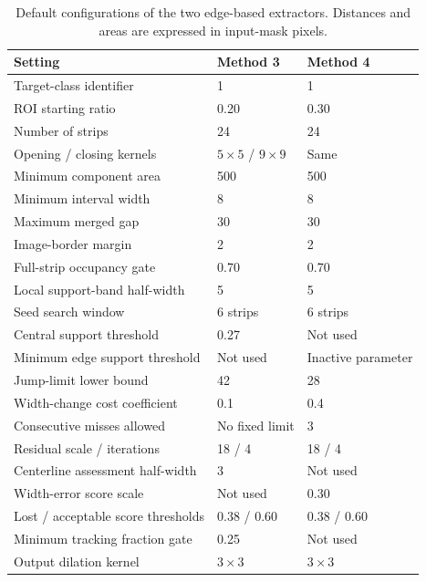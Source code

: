 \begin{table}[htbp]
    \centering
    \small
    \caption{Default configurations of the two edge-based extractors.
    Distances and areas are expressed in input-mask pixels.}
    \label{tab:c4_defaults}
    \begin{tabularx}{\textwidth}{@{}X l l@{}}
        \toprule
        Setting & Method 3 & Method 4 \\
        \midrule
        Target-class identifier & 1 & 1 \\
        ROI starting ratio & 0.20 & 0.30 \\
        Number of strips & 24 & 24 \\
        Opening / closing kernels & $5\times5$ / $9\times9$ & Same \\
        Minimum component area & 500 & 500 \\
        Minimum interval width & 8 & 8 \\
        Maximum merged gap & 30 & 30 \\
        Image-border margin & 2 & 2 \\
        Full-strip occupancy gate & 0.70 & 0.70 \\
        Local support-band half-width & 5 & 5 \\
        Seed search window & 6 strips & 6 strips \\
        Central support threshold & 0.27 & Not used \\
        Minimum edge support threshold & Not used & Inactive parameter \\
        Jump-limit lower bound & 42 & 28 \\
        Width-change cost coefficient & 0.1 & 0.4 \\
        Consecutive misses allowed & No fixed limit & 3 \\
        Residual scale / iterations & 18 / 4 & 18 / 4 \\
        Centerline assessment half-width & 3 & Not used \\
        Width-error score scale & Not used & 0.30 \\
        Lost / acceptable score thresholds & 0.38 / 0.60 & 0.38 / 0.60 \\
        Minimum tracking fraction gate & 0.25 & Not used \\
        Output dilation kernel & $3\times3$ & $3\times3$ \\
        \bottomrule
    \end{tabularx}
\end{table}

